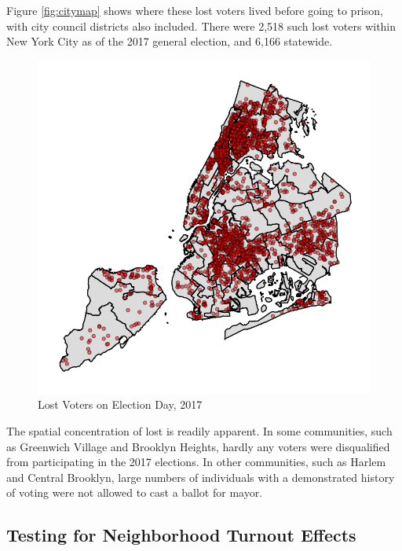 \documentclass[]{article}
\begin{document}
Figure \ref{fig:citymap} shows where these lost voters lived before going to prison, with city council districts also included. There were 2,518 such lost voters within New York City as of the 2017 general election, and 6,166 statewide.

\begin{figure}[H]

{\centering \includegraphics{felony_disenfranchisement_nys_files/figure-latex/citywide-map-1} 

}

\caption{\label{fig:citymap}Lost Voters on Election Day, 2017}\label{fig:citywide-map}
\end{figure}

The spatial concentration of lost is readily apparent. In some communities, such as Greenwich Village and Brooklyn Heights, hardly any voters were disqualified from participating in the 2017 elections. In other communities, such as Harlem and Central Brooklyn, large numbers of individuals with a demonstrated history of voting were not allowed to cast a ballot for mayor.

\hypertarget{testing-for-neighborhood-turnout-effects}{%
\subsection*{Testing for Neighborhood Turnout Effects}\label{testing-for-neighborhood-turnout-effects}}
\end{document}
